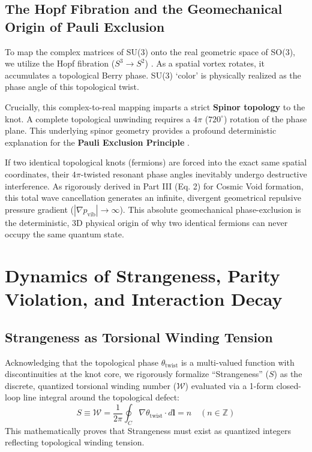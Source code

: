 \documentclass[reprint,amsmath,amssymb,aps,prd]{revtex4-2}
\begin{document}
\subsection{The Hopf Fibration and the Geomechanical Origin of Pauli Exclusion}
To map the complex matrices of SU(3) onto the real geometric space of SO(3), we utilize the Hopf fibration ($S^3 \to S^2$) \cite{Hopf1931}. As a spatial vortex rotates, it accumulates a topological Berry phase. SU(3) `color' is physically realized as the phase angle of this topological twist.

Crucially, this complex-to-real mapping imparts a strict \textbf{Spinor topology} to the knot. A complete topological unwinding requires a $4\pi$ ($720^\circ$) rotation of the phase plane. This underlying spinor geometry provides a profound deterministic explanation for the \textbf{Pauli Exclusion Principle} \cite{Pauli1925}.

If two identical topological knots (fermions) are forced into the exact same spatial coordinates, their $4\pi$-twisted resonant phase angles inevitably undergo destructive interference. As rigorously derived in Part III \cite{YooPart3} (Eq. 2) for Cosmic Void formation, this total wave cancellation generates an infinite, divergent geometrical repulsive pressure gradient ($|\nabla p_{\mathrm{vib}}| \to \infty$). This absolute geomechanical phase-exclusion is the deterministic, 3D physical origin of why two identical fermions can never occupy the same quantum state.

\section{Dynamics of Strangeness, Parity Violation, and Interaction Decay}

\subsection{Strangeness as Torsional Winding Tension}
Acknowledging that the topological phase $\theta_{\mathrm{twist}}$ is a multi-valued function with discontinuities at the knot core, we rigorously formalize ``Strangeness'' ($S$) as the discrete, quantized torsional winding number ($\mathcal{W}$) evaluated via a 1-form closed-loop line integral around the topological defect:
\begin{equation}
S \equiv \mathcal{W} = \frac{1}{2\pi} \oint_C \nabla \theta_{\mathrm{twist}} \cdot d\mathbf{l} = n \quad (n \in \mathbb{Z})
\end{equation}
This mathematically proves that Strangeness must exist as quantized integers reflecting topological winding tension.
\end{document}
